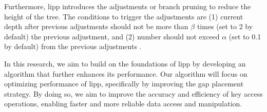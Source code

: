 Furthermore, \acrshort{lipp} introduces the adjustments or branch pruning to reduce the height of the tree. The conditions to trigger the adjustments are (1) current depth after previous adjustments should not be more than $\beta$ times (set to 2 by default) the previous adjustment, and (2) \conflict number should not exceed $\alpha$ (set to 0.1 by default) from the previous adjustments \cite{LIPP}. 

In this research, we aim to build on the foundations of \acrshort{lipp} by developing an algorithm that further enhances its performance. Our algorithm will focus on optimizing performance of \acrshort{lipp}, specifically by improving the gap placement strategy. By doing so, we aim to improve the accuracy and efficiency of key access operations, enabling faster and more reliable data access and manipulation.
